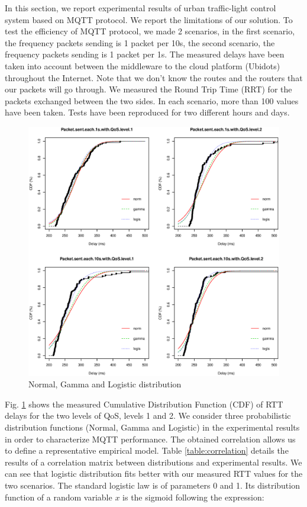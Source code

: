 \documentclass[conference]{../../setup/IEEEtran}
\begin{document}
In this section, we report experimental results of urban traffic-light control system based on MQTT protocol. We report the limitations of our solution. To test the efficiency of MQTT protocol, we made 2 scenarios, in the first scenario, the frequency  packets sending  is 1 packet per 10s, the second scenario, the frequency  packets sending  is 1 packet per 1s. The measured delays have been taken into account between the middleware to the cloud platform (Ubidots) throughout the Internet. Note that we don't know the routes and the routers that our packets will go through. We measured the Round Trip Time (RRT) for the packets exchanged between the two sides. In each scenario, more than 100 values have been taken. Tests have been reproduced for two different hours and days.


\begin{figure}[!htb]
\centering
\includegraphics[width=\columnwidth]{Figures/distributions_v3.eps}
\caption{Normal, Gamma and Logistic distribution}
\label{fig:cdf_distribution.pdf}
\end{figure}

Fig. \ref{fig:cdf_distribution.pdf} shows the measured Cumulative Distribution Function (CDF) of RTT delays for the two levels of QoS, levels 1 and 2. We consider three probabilistic distribution functions (Normal, Gamma and Logistic) in the experimental results in order to characterize MQTT performance. The obtained correlation allows us to define a representative empirical model. Table \ref{table:correlation} details the results of a correlation matrix between distributions and experimental results. We can see that logistic distribution \cite{STEPHENS1979} fits better with our measured RTT values for the two scenarios. The standard logistic law is of parameters 0 and 1. Its distribution function of a random variable $x$ is the sigmoid following the expression:
\end{document}
